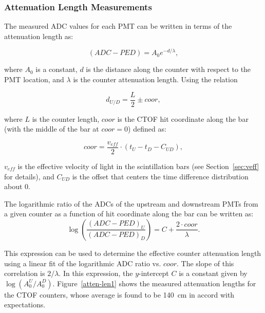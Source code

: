 \documentclass[3p,times,twocolumn]{elsarticle}
\begin{document}
\subsubsection{Attenuation Length Measurements}
\label{sec:attlen}

The measured ADC values for each PMT can be written in terms of the attenuation length as:

\begin{equation}
\label{al-adc}
(ADC - PED) = A_0 e^{-d/\lambda},
\end{equation}

\noindent
where $A_0$ is a constant, $d$ is the distance along the counter with respect to the PMT location, and
$\lambda$ is the counter attenuation length. Using the relation

\begin{equation}
d_{U/D} = \frac{L}{2} \pm coor,
\end{equation}

\noindent
where $L$ is the counter length, $coor$ is the CTOF hit coordinate along the bar (with the middle of the bar
at $coor=0$) defined as:

\begin{equation}
\label{coor}
coor = \frac{v_{eff}}{2} \cdot (t_U - t_D - C_{UD}),
\end{equation}

\noindent
$v_{eff}$ is the effective velocity of light in the scintillation bars (see Section~\ref{sec:veff} for details), and
$C_{UD}$ is the offset that centers the time difference distribution about 0.

The logarithmic ratio of the ADCs of the upstream and downstream PMTs from a given counter as a function of
hit coordinate along the bar can be written as:
\begin{equation}
\label{linear}
\log \left( \frac{(ADC-PED)_U}{(ADC-PED)_D} \right ) = C + \frac{2 \cdot coor}{\lambda}.
\end{equation}

\noindent
This expression can be used to determine the effective counter attenuation length using a linear fit of the
logarithmic ADC ratio vs. $coor$. The slope of this correlation is $2/\lambda$. In this expression, the
$y$-intercept $C$ is a constant given by $\log(A_0^U/A_0^D)$. Figure~\ref{atten-len1} shows the measured
attenuation lengths for the CTOF counters, whose average is found to be 140~cm in accord with expectations. 
\end{document}

